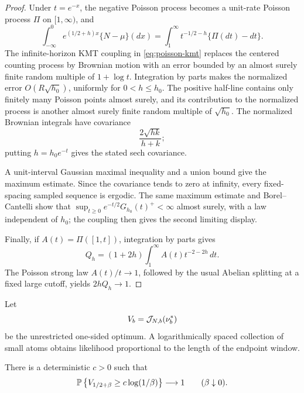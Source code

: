 \begin{proof}
Under \(t=e^{-x}\), the negative Poisson process becomes a unit-rate Poisson
process \(\Pi\) on \([1,\infty)\), and
\[
    \int_{-\infty}^0e^{(1/2+h)x}\{N-\mu\}(dx)
    =\int_1^\infty t^{-1/2-h}\{\Pi(dt)-dt\}.
\]
The infinite-horizon KMT coupling in
\eqref{eq:poisson-kmt} replaces the centered counting process by Brownian
motion with an error bounded by an almost surely finite random multiple of
\(1+\log t\). Integration by parts makes the normalized error
\(O(R\sqrt{h_0})\), uniformly for \(0<h\le h_0\). The positive half-line
contains only finitely many Poisson points almost surely, and its contribution
to the normalized process is another almost surely finite random multiple of
\(\sqrt{h_0}\). The normalized Brownian integrals have covariance
\[
    \frac{2\sqrt{hk}}{h+k};
\]
putting \(h=h_0e^{-t}\) gives the stated sech covariance.

A unit-interval Gaussian maximal inequality and a union bound give the
maximum estimate. Since the covariance tends to zero at infinity, every
fixed-spacing sampled sequence is ergodic. The same maximum estimate and
Borel--Cantelli show that
\(\sup_{t\ge0}e^{-t/2}G_{h_0}(t)^+<\infty\) almost surely, with a law
independent of \(h_0\); the coupling then gives the second limiting display.

Finally, if \(A(t)=\Pi([1,t])\), integration by parts gives
\[
    Q_h=(1+2h)\int_1^\infty A(t)t^{-2-2h}\,dt.
\]
The Poisson strong law \(A(t)/t\to1\), followed by the usual Abelian
splitting at a fixed large cutoff, yields \(2hQ_h\to1\).
\end{proof}

Let
\[
    V_b=\mathcal J_{N,b}(\nu_b^*)
\]
be the unrestricted one-sided optimum. A logarithmically spaced collection
of small atoms obtains likelihood proportional to the length of the endpoint
window.
\begin{proposition}
\label{prop:atom-many-gain}
There is a deterministic \(c>0\) such that
\[
    \mathbb{P}\left\{V_{1/2+\beta}\ge c\log(1/\beta)\right\}
    \longrightarrow1
    \qquad(\beta\downarrow0).
\]
\end{proposition}

